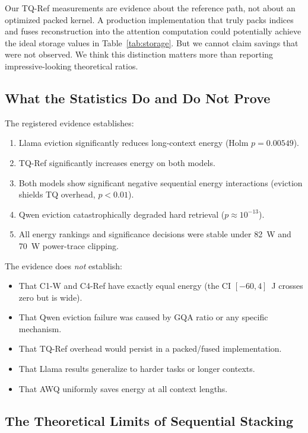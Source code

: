 \documentclass[sigconf,nonacm]{acmart}
\begin{document}
Our TQ-Ref measurements are evidence about the reference path, not about an
optimized packed kernel. A production implementation that truly packs indices and
fuses reconstruction into the attention computation could potentially achieve the
ideal storage values in Table~\ref{tab:storage}. But we cannot claim savings that
were not observed. We think this distinction matters more than reporting
impressive-looking theoretical ratios.

\subsection{What the Statistics Do and Do Not Prove}

The registered evidence establishes:
\begin{enumerate}
  \item Llama eviction significantly reduces long-context energy (Holm $p = 0.00549$).
  \item TQ-Ref significantly increases energy on both models.
  \item Both models show significant negative sequential energy interactions
    (eviction shields TQ overhead, $p < 0.01$).
  \item Qwen eviction catastrophically degraded hard retrieval
    ($p \approx 10^{-13}$).
  \item All energy rankings and significance decisions were stable under 82~W and
    70~W power-trace clipping.
\end{enumerate}

The evidence does \emph{not} establish:
\begin{itemize}
  \item That C1-W and C4-Ref have exactly equal energy (the CI $[-60, 4]$~J
    crosses zero but is wide).
  \item That Qwen eviction failure was caused by GQA ratio or any specific
    mechanism.
  \item That TQ-Ref overhead would persist in a packed/fused implementation.
  \item That Llama results generalize to harder tasks or longer contexts.
  \item That AWQ uniformly saves energy at all context lengths.
\end{itemize}

\subsection{The Theoretical Limits of Sequential Stacking}
\end{document}
